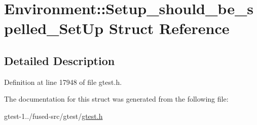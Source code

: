 \hypertarget{structtesting_1_1Environment_1_1Setup__should__be__spelled__SetUp}{\section{\-Environment\-:\-:\-Setup\-\_\-should\-\_\-be\-\_\-spelled\-\_\-\-Set\-Up \-Struct \-Reference}
\label{d9/dcc/structtesting_1_1Environment_1_1Setup__should__be__spelled__SetUp}
}


\subsection{\-Detailed \-Description}


\-Definition at line 17948 of file gtest.\-h.



\-The documentation for this struct was generated from the following file\-:\begin{DoxyCompactItemize}
\item 
gtest-\/1../fused-\/src/gtest/\hyperlink{fused-src_2gtest_2gtest_8h}{gtest.\-h}\end{DoxyCompactItemize}

